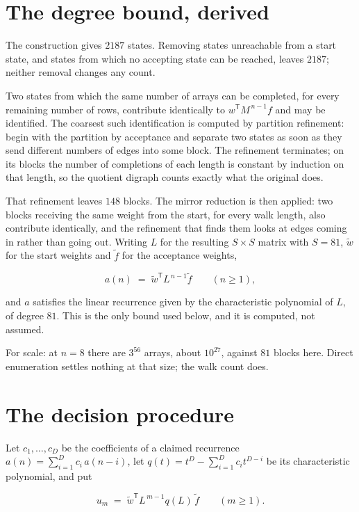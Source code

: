 \documentclass[11pt]{article}
\theoremstyle{definition}
\begin{document}
\section{The degree bound, derived}

The construction gives $2187$ states. Removing states unreachable from a start state, and states from which no accepting state can be reached, leaves $2187$; neither removal changes any count.

Two states from which the same number of arrays can be completed, for every remaining number of rows, contribute identically to $w^{\mathsf T}M^{\,n-1}f$ and may be identified. The coarsest such identification is computed by partition refinement: begin with the partition by acceptance and separate two states as soon as they send different numbers of edges into some block. The refinement terminates; on its blocks the number of completions of each length is constant by induction on that length, so the quotient digraph counts exactly what the original does.

That refinement leaves $148$ blocks. The mirror reduction is then applied: two blocks receiving the same weight from the start, for every walk length, also contribute identically, and the refinement that finds them looks at edges coming in rather than going out. Writing $L$ for the resulting $S \times S$ matrix with $S = 81$, $\tilde w$ for the start weights and $\tilde f$ for the acceptance weights,

\[a(n) \;=\; \tilde w^{\mathsf T} L^{\,n-1} \tilde f \qquad (n \ge 1),\]

and $a$ satisfies the linear recurrence given by the characteristic polynomial of $L$, of degree $81$. This is the only bound used below, and it is computed, not assumed.

For scale: at $n = 8$ there are $3^{56}$ arrays, about $10^{27}$, against $81$ blocks here. Direct enumeration settles nothing at that size; the walk count does.

\section{The decision procedure}

Let $c_1,\dots,c_D$ be the coefficients of a claimed recurrence $a(n) = \sum_{i=1}^{D} c_i\,a(n-i)$, let $q(t) = t^{D} - \sum_{i=1}^{D} c_i t^{D-i}$ be its characteristic polynomial, and put

\[u_m \;=\; \tilde w^{\mathsf T} L^{\,m-1} q(L)\,\tilde f \qquad (m \ge 1).\]
\end{document}
